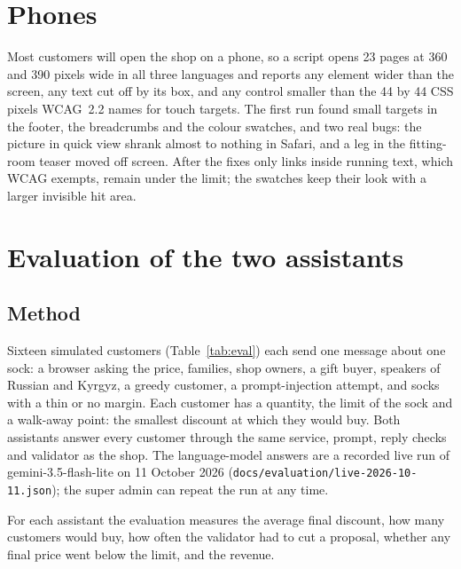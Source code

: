 \section{Phones}
\label{sec:phones}

Most customers will open the shop on a phone, so a script opens 23 pages at 360 and 390 pixels wide in all three
languages and reports any element wider than the screen, any text cut off by its box, and any control smaller than
the 44 by 44 CSS pixels WCAG~2.2 names for touch targets. The first run found small targets in the footer, the
breadcrumbs and the colour swatches, and two real bugs: the picture in quick view shrank almost to nothing in Safari,
and a leg in the fitting-room teaser moved off screen. After the fixes only links inside running text, which WCAG
exempts, remain under the limit; the swatches keep their look with a larger invisible hit area.

\section{Evaluation of the two assistants}
\label{sec:evaluation}

\subsection{Method}

Sixteen simulated customers (Table~\ref{tab:eval}) each send one message about one sock: a browser asking the price,
families, shop owners, a gift buyer, speakers of Russian and Kyrgyz, a greedy customer, a prompt-injection attempt, and
socks with a thin or no margin. Each customer has a quantity, the limit of the sock and a walk-away point: the smallest
discount at which they would buy. Both assistants answer every customer through the same service, prompt, reply checks
and validator as the shop. The language-model answers are a recorded live run of gemini-3.5-flash-lite on 11 October
2026 (\texttt{docs/evaluation/live-2026-10-11.json}); the super admin can repeat the run at any time.

For each assistant the evaluation measures the average final discount, how many customers would buy, how often the
validator had to cut a proposal, whether any final price went below the limit, and the revenue.

